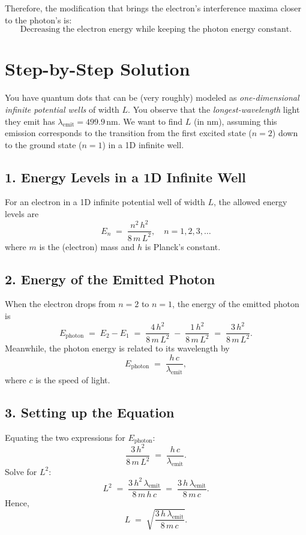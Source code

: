 \documentclass[12pt]{article}
\theoremstyle{definition} %
\theoremstyle{plain} %
\begin{document}
Therefore, the modification that brings the electron's interference maxima closer to the photon's is:
\[
\boxed{\text{Decreasing the electron energy while keeping the photon energy constant.}}
\]

\section*{Step-by-Step Solution}

You have quantum dots that can be (very roughly) modeled as 
\emph{one-dimensional infinite potential wells} of width \(L\). 
You observe that the \emph{longest-wavelength} light they emit 
has \(\lambda_{\mathrm{emit}} = 499.9\,\mathrm{nm}\).  
We want to find \(L\) (in nm), assuming this emission 
corresponds to the transition from the first excited state 
(\(n=2\)) down to the ground state (\(n=1\)) in a 1D infinite well.

\subsection*{1. Energy Levels in a 1D Infinite Well}

For an electron in a 1D infinite potential well of width \(L\),
the allowed energy levels are
\[
E_{n} \;=\; \frac{n^2\,h^2}{8\,m\,L^2},
\quad
n = 1,2,3,\dots
\]
where \(m\) is the (electron) mass and \(h\) is Planck's constant.

\subsection*{2. Energy of the Emitted Photon}

When the electron drops from \(n=2\) to \(n=1\), the energy of the emitted photon is
\[
E_{\mathrm{photon}}
\;=\;
E_{2} - E_{1}
\;=\;
\frac{4\,h^2}{8\,m\,L^2}
\;-\;
\frac{1\,h^2}{8\,m\,L^2}
\;=\;
\frac{3\,h^2}{8\,m\,L^2}.
\]
Meanwhile, the photon energy is related to its wavelength by
\[
E_{\mathrm{photon}} \;=\; \frac{h\,c}{\lambda_{\mathrm{emit}}},
\]
where \(c\) is the speed of light.

\subsection*{3. Setting up the Equation}

Equating the two expressions for \(E_{\mathrm{photon}}\):
\[
\frac{3\,h^2}{8\,m\,L^2}
\;=\;
\frac{h\,c}{\lambda_{\mathrm{emit}}}.
\]
Solve for \(L^2\):
\[
L^2
\;=\;
\frac{3\,h^2\,\lambda_{\mathrm{emit}}}{8\,m\,h\,c}
\;=\;
\frac{3\,h\,\lambda_{\mathrm{emit}}}{8\,m\,c}.
\]
Hence,
\[
L
\;=\;
\sqrt{\frac{3\,h\,\lambda_{\mathrm{emit}}}{8\,m\,c}}.
\]
\end{document}
